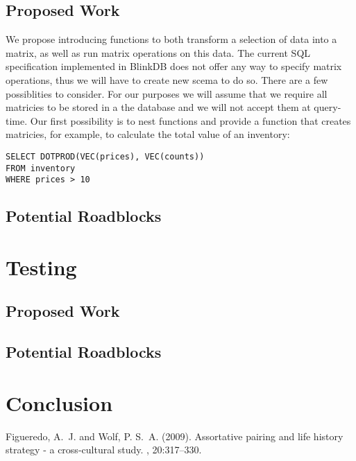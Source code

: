\documentclass[twoside]{article}
\begin{document}
\begin{multicols}{2}
\subsection{Proposed Work}
We propose introducing functions to both transform a selection of data into a matrix, as well as run matrix operations on this data. The current SQL specification implemented in BlinkDB does not offer any way to specify matrix operations, thus we will have to create new scema to do so. There are a few possiblities to consider. For our purposes we will assume that we require all matricies to be stored in a the database and we will not accept them at query-time. Our first possibility is to nest functions and provide a function that creates matricies, for example, to calculate the total value of an inventory:

\begin{verbatim}
SELECT DOTPROD(VEC(prices), VEC(counts))
FROM inventory
WHERE prices > 10
\end{verbatim}

\subsection{Potential Roadblocks}

\section{Testing}
\subsection{Proposed Work}
\subsection{Potential Roadblocks}

\section{Conclusion}


\begin{thebibliography}{99} %

Figueredo, A.~J. and Wolf, P. S.~A. (2009).
\newblock Assortative pairing and life history strategy - a cross-cultural
  study.
, 20:317--330.
 
\end{thebibliography}


\end{multicols}
\end{document}
